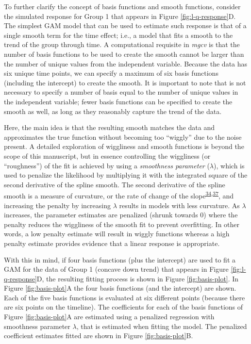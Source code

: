 \documentclass[
]{article}
\begin{document}
To further clarify the concept of basis functions and smooth functions, consider the simulated response for Group 1 that appears in Figure \ref{fig:l-q-response}D. The simplest GAM model that can be used to estimate such response is that of a single smooth term for the time effect; i.e., a model that fits a smooth to the trend of the group through time. A computational requisite in \emph{mgcv} is that the number of basis functions to be used to create the smooth cannot be larger than the number of unique values from the independent variable. Because the data has six unique time points, we can specify a maximum of six basis functions (including the intercept) to create the smooth. It is important to note that is not necessary to specify a number of basis equal to the number of unique values in the independent variable; fewer basis functions can be specified to create the smooth as well, as long as they reasonably capture the trend of the data.

Here, the main idea is that the resulting smooth matches the data and approximates the true function without becoming too ``wiggly'' due to the noise present. A detailed exploration of wiggliness and smooth functions is beyond the scope of this manuscript, but in essence controlling the wiggliness (or ``roughness'') of the fit is achieved by using a \emph{smoothness parameter} (\(\lambda\)), which is used to penalize the likelihood by multiplying it with the integrated square of the second derivative of the spline smooth. The second derivative of the spline smooth is a measure of curvature, or the rate of change of the slope\textsuperscript{\protect\hyperlink{ref-simpson2018}{34},\protect\hyperlink{ref-wood2017}{37}}, and increasing the penalty by increasing \(\lambda\) results in models with less curvature. As \(\lambda\) increases, the parameter estimates are penalized (shrunk towards 0) where the penalty reduces the wiggliness of the smooth fit to prevent overfitting. In other words, a low penalty estimate will result in wiggly functions whereas a high penalty estimate provides evidence that a linear response is appropriate.

With this in mind, if four basis functions (plus the intercept) are used to fit a GAM for the data of Group 1 (concave down trend) that appears in Figure \ref{fig:l-q-response}D, the resulting fitting process is shown in Figure \ref{fig:basis-plot}. In Figure \ref{fig:basis-plot}A the four basis functions (and the intercept) are shown. Each of the five basis functions is evaluated at six different points (because there are six points on the timeline). The coefficients for each of the basis functions of Figure \ref{fig:basis-plot}A are estimated using a penalized regression with smoothness parameter \(\lambda\), that is estimated when fitting the model. The penalized coefficient estimates fitted are shown in Figure \ref{fig:basis-plot}B.
\end{document}
